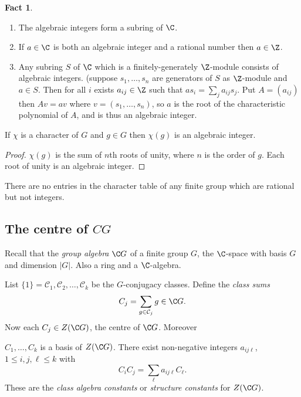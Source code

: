 \documentclass[a4paper]{article}
\newcommand{\ccl}{{\mathcal C}} %
\theoremstyle{definition}
\newtheorem*{fact}{Fact}
\begin{document}
\begin{fact}\leavevmode
  \begin{enumerate}
  \item The algebraic integers form a subring of \(\C\).
  \item If \(a \in \C\) is both an algebraic integer and a rational number then \(a \in \Z\).
  \item Any subring \(S\) of \(\C\) which is a finitely-generately \(\Z\)-module consists of algebraic integers. (suppose \(s_1, \dots, s_n\) are generators of \(S\) as \(\Z\)-module and \(a \in S\). Then for all \(i\) exists \(a_{ij} \in \Z\) such that \(as_i = \sum_j a_{ij} s_j\). Put \(A = (a_{ij})\) then \(Av = av\) where \(v = (s_1, \dots, s_n)\), so \(a\) is the root of the characteristic polynomial of \(A\), and is thus an algebraic integer.
  \end{enumerate}
\end{fact}

\begin{proposition}
  If \(\chi\) is a character of \(G\) and \(g \in G\) then \(\chi(g)\) is an algebraic integer.
\end{proposition}

\begin{proof}
  \(\chi(g)\) is the sum of \(n\)th roots of unity, where \(n\) is the order of \(g\). Each root of unity is an algebraic integer.
\end{proof}

\begin{corollary}
  There are no entries in the character table of any finite group which are rational but not integers.
\end{corollary}

\subsection{The centre of \(C G\)} %

Recall that the \emph{group algebra} \(\C G\) of a finite group \(G\), the \(\C\)-space with basis \(G\) and dimension \(|G|\). Also a ring and a \(\C\)-algebra.

List \(\{1\} = \ccl_1, \ccl_2, \dots, \ccl_k\) be the \(G\)-conjugacy classes. Define the \emph{class sums}
\[
  C_j = \sum_{g \in \mathcal C_j} g \in \C G.
\]
Now each \(C_j \in Z(\C G)\), the centre of \(\C G\). Moreover
\begin{proposition}
  \(C_1, \dots, C_k\) is a basis of \(Z(\C G)\). There exist non-negative integers \(a_{ij\ell}\), \(1 \leq i, j, \ell \leq k\) with
  \[
    C_iC_j = \sum_\ell a_{ij\ell} C_\ell.
  \]
  These are the \emph{class algebra constants} or \emph{structure constants} for \(Z(\C G)\).
\end{proposition}
\end{document}
